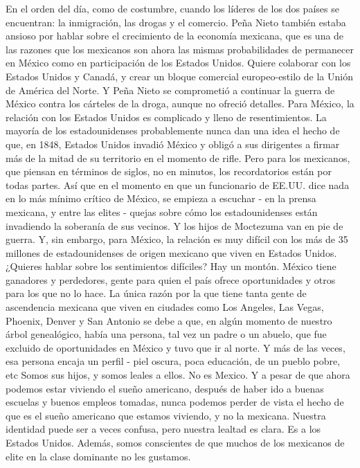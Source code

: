 En el orden del día, como de costumbre, cuando los líderes de los dos países se encuentran: la inmigración, las drogas y el comercio.
Peña Nieto también estaba ansioso por hablar sobre el crecimiento de la economía mexicana, que es una de las razones que los mexicanos son ahora las mismas probabilidades de permanecer en México como en participación de los Estados Unidos.
Quiere colaborar con los Estados Unidos y Canadá, y crear un bloque comercial europeo-estilo de la Unión de América del Norte.
Y Peña Nieto se comprometió a continuar la guerra de México contra los cárteles de la droga, aunque no ofreció detalles.
Para México, la relación con los Estados Unidos es complicado y lleno de resentimientos.
La mayoría de los estadounidenses probablemente nunca dan una idea el hecho de que, en 1848, Estados Unidos invadió México y obligó a sus dirigentes a firmar más de la mitad de su territorio en el momento de rifle.
Pero para los mexicanos, que piensan en términos de siglos, no en minutos, los recordatorios están por todas partes.
Así que en el momento en que un funcionario de EE.UU. dice nada en lo más mínimo crítico de México, se empieza a escuchar - en la prensa mexicana, y entre las elites - quejas sobre cómo los estadounidenses están invadiendo la soberanía de sus vecinos.
Y los hijos de Moctezuma van en pie de guerra.
Y, sin embargo, para México, la relación es muy difícil con los más de 35 millones de estadounidenses de origen mexicano que viven en Estados Unidos.
¿Quieres hablar sobre los sentimientos difíciles?
Hay un montón.
México tiene ganadores y perdedores, gente para quien el país ofrece oportunidades y otros para los que no lo hace.
La única razón por la que tiene tanta gente de ascendencia mexicana que viven en ciudades como Los Angeles, Las Vegas, Phoenix, Denver y San Antonio se debe a que, en algún momento de nuestro árbol genealógico, había una persona, tal vez un padre o un abuelo, que fue excluido de oportunidades en México y tuvo que ir al norte.
Y más de las veces, esa persona encaja un perfil - piel oscura, poca educación, de un pueblo pobre, etc
Somos sus hijos, y somos leales a ellos.
No es Mexico.
Y a pesar de que ahora podemos estar viviendo el sueño americano, después de haber ido a buenas escuelas y buenos empleos tomadas, nunca podemos perder de vista el hecho de que es el sueño americano que estamos viviendo, y no la mexicana.
Nuestra identidad puede ser a veces confusa, pero nuestra lealtad es clara.
Es a los Estados Unidos.
Además, somos conscientes de que muchos de los mexicanos de elite en la clase dominante no les gustamos.
